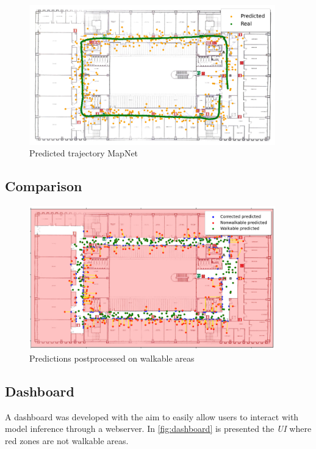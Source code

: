 \begin{figure}[h]
    \begin{center}
        \includegraphics[width=0.95\textwidth]{./imgs/mapnet_map.png}
    \end{center}
    \caption{Predicted trajectory MapNet}
    \label{fig:trajectory-mapnet}
\end{figure}

\subsection{Comparison}
\begin{figure}[h]
    \begin{center}
        \includegraphics[width=0.95\textwidth]{./imgs/walkable_postprocess.png}
    \end{center}
    \caption{Predictions postprocessed on walkable areas}
    \label{fig:trajectory-mapnet}
\end{figure}

\subsection{Dashboard}
A dashboard was developed with the aim to easily allow users to interact with model inference through a webserver. In \cref{fig:dashboard} is presented the \textit{UI} where red zones are not walkable areas.

